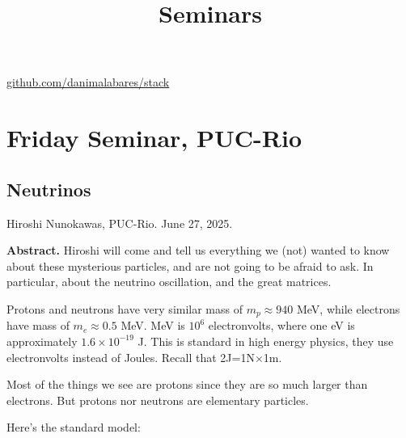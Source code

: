 



\title{Seminars}
\maketitle

\label{section-phantom}
\hfill
\href{http://github.com/danimalabares/stack}{github.com/danimalabares/stack}

\tableofcontents

\section{Friday Seminar, PUC-Rio}
\label{section-Friday-seminar}

\subsection{Neutrinos}
\label{subsection-neutrinos}

\noindent\bigskip
Hiroshi Nunokawas, PUC-Rio. June 27, 2025.

{\bf Abstract.} Hiroshi will come and tell us everything we (not) wanted to know
about these mysterious particles, and are not going to be afraid to ask. In
particular, about the neutrino oscillation, and the great matrices.

\bigskip\noindent

Protons and neutrons have very similar mass of $m_p\approx940$ MeV, while
electrons have mass of $m_e \approx 0.5$ MeV. MeV is $10^{6}$ electronvolts,
where one eV is approximately $1.6\times 10^{-19}$ J. This is standard in high
energy physics, they use electronvolts instead of Joules. Recall that
2J=1N$\times$1m.

Most of the things we see are protons since they are so much larger than
electrons. But protons nor neutrons are elementary particles.

Here's the standard model:

\medskip

